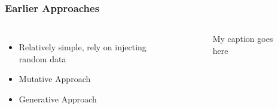 \begin{frame}
\frametitle{Earlier Approaches}
\begin{columns}
\begin{itemize}
\item{Relatively simple, rely on injecting random data}
\item{Mutative Approach}
\item{Generative Approach}
\end{itemize}
\begin{figure}
\caption{My caption goes here}
\end{figure}
\end{columns}
\end{frame}
